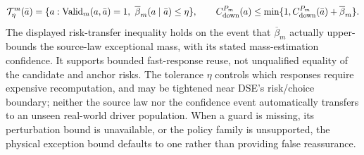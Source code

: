 \documentclass[10pt]{article}
\begin{document}
\begin{equation}
 \mathcal T_{\eta}^{m}(\bar a)=\{a:\operatorname{Valid}_m(a,\bar a)=1,
 \ \overline\beta_m(a\mid\bar a)\le\eta\},\qquad
 C_{\rm down}^{P_m}(a)\le\min\{1,C_{\rm down}^{P_m}(\bar a)+\overline\beta_m\}.
 \label{eq:trustregion}
\end{equation}
The displayed risk-transfer inequality holds on the event that $\overline\beta_m$ actually upper-bounds the source-law exceptional mass, with its stated mass-estimation confidence. It supports bounded fast-response reuse, not unqualified equality of the candidate and anchor risks. The tolerance $\eta$ controls which responses require expensive recomputation, and may be tightened near DSE's risk/choice boundary; neither the source law nor the confidence event automatically transfers to an unseen real-world driver population. When a guard is missing, its perturbation bound is unavailable, or the policy family is unsupported, the physical exception bound defaults to one rather than providing false reassurance.
\end{document}
